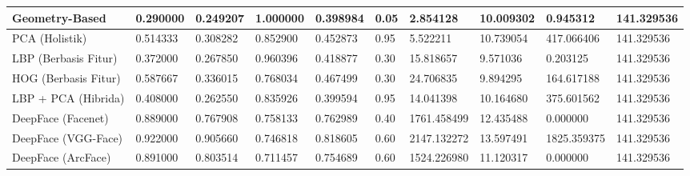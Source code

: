 \begin{table}
\begin{tabular}{|p{3cm}|p{1.5cm}|p{1.5cm}|p{1.5cm}|p{1.5cm}|p{1.5cm}|p{2.5cm}|p{2cm}|p{2cm}|p{2cm}|}
        Geometry-Based      & 0.290000 & 0.249207 & 1.000000 & 0.398984 & 0.05 & 2.854128    & 10.009302 & 0.945312    & 141.329536 \\ \hline
        PCA (Holistik)      & 0.514333 & 0.308282 & 0.852900 & 0.452873 & 0.95 & 5.522211    & 10.739054 & 417.066406  & 141.329536 \\ \hline
        LBP (Berbasis Fitur)& 0.372000 & 0.267850 & 0.960396 & 0.418877 & 0.30 & 15.818657   & 9.571036  & 0.203125    & 141.329536 \\ \hline
        HOG (Berbasis Fitur)& 0.587667 & 0.336015 & 0.768034 & 0.467499 & 0.30 & 24.706835   & 9.894295  & 164.617188  & 141.329536 \\ \hline
        LBP + PCA (Hibrida) & 0.408000 & 0.262550 & 0.835926 & 0.399594 & 0.95 & 14.041398   & 10.164680 & 375.601562  & 141.329536 \\ \hline
        DeepFace (Facenet)  & 0.889000 & 0.767908 & 0.758133 & 0.762989 & 0.40 & 1761.458499 & 12.435488 & 0.000000    & 141.329536 \\ \hline
        DeepFace (VGG-Face) & 0.922000 & 0.905660 & 0.746818 & 0.818605 & 0.60 & 2147.132272 & 13.597491 & 1825.359375 & 141.329536 \\ \hline
        DeepFace (ArcFace)  & 0.891000 & 0.803514 & 0.711457 & 0.754689 & 0.60 & 1524.226980 & 11.120317 & 0.000000    & 141.329536 \\ \hline

    \end{tabular}

\end{table}